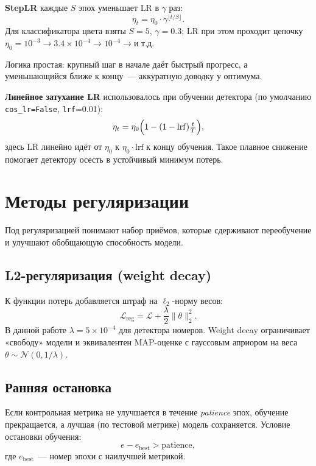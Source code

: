 \documentclass[10pt,a4paper]{report}
\numberwithin{equation}{chapter}
\numberwithin{figure}{chapter}
\numberwithin{table}{chapter}
\begin{document}
\textbf{StepLR} каждые $S$ эпох уменьшает LR в $\gamma$ раз:
\begin{equation}
  \eta_t = \eta_0\cdot\gamma^{\lfloor t/S\rfloor}.
\end{equation}
Для классификатора цвета взяты $S=5$, $\gamma=0.3$; LR при этом
проходит цепочку $\eta_0=10^{-3} \to 3.4\!\times\!10^{-4} \to
10^{-4} \to \text{и т.д.}$

Логика простая: крупный шаг в начале даёт быстрый
прогресс, а уменьшающийся ближе к концу~--- аккуратную доводку у
оптимума.

\textbf{Линейное затухание LR} использовалось при обучении детектора
(по умолчанию \texttt{cos\_lr=False}, \texttt{lrf}=0.01):
\begin{equation}
  \eta_t = \eta_0\Bigl(1-(1-\mathrm{lrf})\tfrac{t}{T}\Bigr),
\end{equation}
здесь LR линейно идёт от $\eta_0$ к $\eta_0\cdot\mathrm{lrf}$ к концу
обучения. Такое плавное снижение помогает детектору осесть в устойчивый
минимум потерь.

\section{Методы регуляризации}

Под регуляризацией понимают набор приёмов, которые сдерживают
переобучение и улучшают обобщающую способность модели.

\subsection{L2-регуляризация (weight decay)}

К функции потерь добавляется штраф на $\ell_2$-норму весов:
\begin{equation}
  \mathcal{L}_{\mathrm{reg}} = \mathcal{L} +
    \frac{\lambda}{2}\|\theta\|_2^2.
\end{equation}
В данной работе $\lambda = 5\!\times\!10^{-4}$ для детектора
номеров. Weight decay ограничивает «свободу» модели и
эквивалентен MAP-оценке с гауссовым априором на веса
$\theta \sim \mathcal{N}(0, 1/\lambda)$.

\subsection{Ранняя остановка}

Если контрольная метрика не улучшается в течение
\textit{patience} эпох, обучение прекращается, а лучшая
(по тестовой метрике) модель сохраняется. Условие остановки обучения:
\begin{equation}
  e - e_{\mathrm{best}} > \mathrm{patience},
\end{equation}
где $e_{\mathrm{best}}$~--- номер эпохи с наилучшей метрикой.
\end{document}
